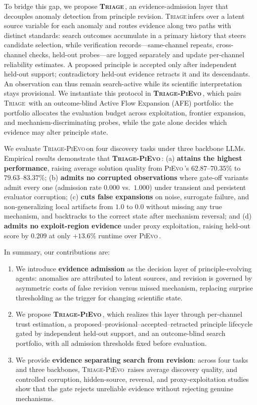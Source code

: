 \documentclass{article}
\newcommand{\triage}{\textsc{Triage}\,}
\newcommand{\method}{\textsc{Triage-PiEvo}\,}
\newcommand{\pievo}{\textsc{PiEvo}\,}
\begin{document}
To bridge this gap, we propose \textbf{\triage}, an evidence-admission layer that decouples anomaly detection from principle revision. 
\triage infers over a latent source variable for each anomaly and routes evidence along two paths with distinct standards: search outcomes accumulate in a primary history that steers candidate selection, while verification records---same-channel repeats, cross-channel checks, held-out probes---are logged separately and update per-channel reliability estimates. A proposed principle is accepted only after independent held-out support; contradictory held-out evidence retracts it and its descendants. An observation can thus remain search-active while its scientific interpretation stays provisional. We instantiate this protocol in \textbf{\method{}}, which pairs \triage{} with an outcome-blind Active Flow Expansion (AFE) portfolio: the portfolio allocates the evaluation budget across exploitation, frontier expansion, and mechanism-discriminating probes, while the gate alone decides which evidence may alter principle state.

We evaluate \method on four discovery tasks under three backbone LLMs.
Empirical results demonstrate that \textbf{\method}: 
(a) \textbf{attains the highest performance}, raising average solution quality from \pievo's $62.87$--$70.35$\% to $79.63$--$83.37$\%; 
(b) \textbf{admits no corrupted observations} where gate-off variants admit every one (admission rate $0.000$ vs.\ $1.000$) under transient and persistent evaluator corruption;
(c) \textbf{cuts false expansions} on noise, surrogate failure, and non-generalizing local artifacts from $1.0$ to $0.0$ without missing any true mechanism, and backtracks to the correct state after mechanism reversal; and
(d) \textbf{admits no exploit-region evidence} under proxy exploitation, raising held-out score by $0.209$ at only $+13.6\%$ runtime over \pievo{}.

In summary, our contributions are:
\begin{enumerate}[nosep, leftmargin=12pt]
  \item[(a)] We introduce \textbf{evidence admission} as the decision layer of principle-evolving agents: anomalies are attributed to latent sources, and revision is governed by asymmetric costs of false revision versus missed mechanism, replacing surprise thresholding as the trigger for changing scientific state.
  \item[(b)] We propose \textbf{\method{}}, which realizes this layer through per-channel trust estimation, a proposed--provisional--accepted--retracted principle lifecycle gated by independent held-out support, and an outcome-blind search portfolio, with all admission thresholds fixed before evaluation.
  \item[(c)] We provide \textbf{evidence separating search from revision}: across four tasks and three backbones, \method{} raises average discovery quality, and controlled corruption, hidden-source, reversal, and proxy-exploitation studies show that the gate rejects unreliable evidence without rejecting genuine mechanisms.
\end{enumerate}
\end{document}
